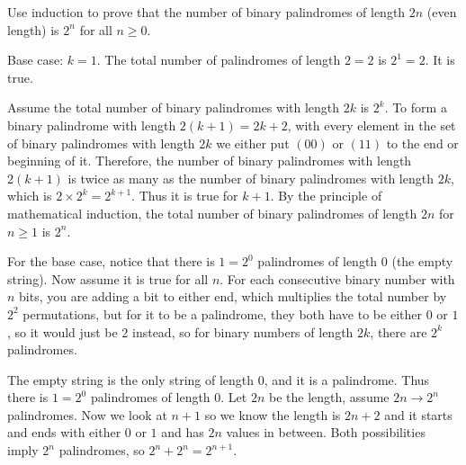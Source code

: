 \begin{eval}
Use induction to prove that the number of binary palindromes of length $2n$ (even length) is 
$2^n$ for all $n\geq 0$.
\begin{spfenum}
\item
Base case: $k=1$.  The total number of palindromes of length $2=2$ is $2^1=2$.  It is true.

\noindent
Assume the total number of binary palindromes with length $2k$ is $2^k$.  To form a binary palindrome
with length $2(k+1)=2k+2$, with every element in the set of binary palindromes with length $2k$ we either
put $(00)$ or $(11)$ to the end or beginning of it.  
Therefore, the number of binary palindromes with length $2(k+1)$ is twice as many as the number of
binary palindromes with length $2k$, which is $2\times2^k=2^{k+1}$.  Thus it is true for $k+1$.
By the principle of mathematical induction, the total number of binary palindromes of length
$2n$ for $n\geq 1$ is $2^n$.

\noindent
\evallinethree
\item
For the base case, notice that there is $1=2^0$ palindromes of length $0$ (the empty string).
Now assume it is true for all $n$.
For each consecutive binary number with $n$ bits, you are adding a bit to either end, which multiplies
the total number by $2^2$ permutations, but for it to be a palindrome, they both have to be either
$0$ or $1$, so it would just be $2$ instead, so for binary numbers of length $2k$, there are $2^k$ 
palindromes.

\noindent
\evallinethree
\item
The empty string is the only string of length $0$, and it is a palindrome.  
Thus there is $1=2^0$ palindromes of length $0$.
Let $2n$ be the length, assume $2n\rightarrow 2^n$ palindromes.
Now we look at $n+1$ so we know the length is $2n+2$ and it starts and ends with
either $0$ or $1$ and has $2n$ values in between.
Both possibilities imply $2^n$ palindromes, so $2^n+2^n=2^{n+1}$.

\noindent
\evallinethree
\end{spfenum}


\end{eval}
